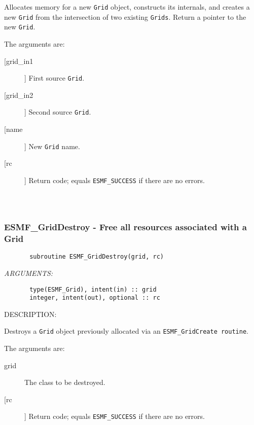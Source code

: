       Allocates memory for a new {\tt Grid} object, constructs its
       internals, and creates a new {\tt Grid} from the intersection of two
       existing {\tt Grids}.  Return a pointer to the new {\tt Grid}.
  
       The arguments are:
       \begin{description}
       \item[[grid\_in1]]
            First source {\tt Grid}.
       \item[[grid\_in2]]
            Second source {\tt Grid}.
       \item[[name]]
            New {\tt Grid} name.
       \item[[rc]]
            Return code; equals {\tt ESMF\_SUCCESS} if there are no errors.
     \end{description}
  
\begin{verbatim} \end{verbatim}
 
 
\mbox{}\hrulefill\ 
 
\subsubsection{ESMF\_GridDestroy - Free all resources associated with a Grid }


\begin{verbatim}       subroutine ESMF_GridDestroy(grid, rc)\end{verbatim}{\em ARGUMENTS:}
\begin{verbatim}       type(ESMF_Grid), intent(in) :: grid
       integer, intent(out), optional :: rc\end{verbatim}
{\sf DESCRIPTION:\\ }


       Destroys a {\tt Grid} object previously allocated
       via an {\tt ESMF\_GridCreate routine}.
  
       The arguments are:
       \begin{description}
       \item[grid]
            The class to be destroyed.
       \item[[rc]]
            Return code; equals {\tt ESMF\_SUCCESS} if there are no errors.
       \end{description}
   
